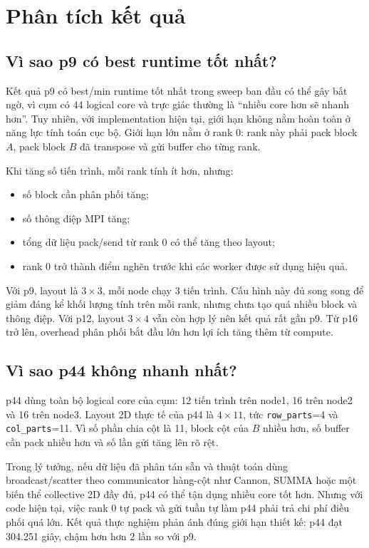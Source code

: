 \documentclass[12pt,a4paper]{article}
\newcommand{\code}[1]{\texttt{#1}}
\begin{document}
\section{Phân tích kết quả}
\subsection{Vì sao p9 có best runtime tốt nhất?}
Kết quả p9 có best/min runtime tốt nhất trong sweep ban đầu có thể gây bất ngờ, vì cụm có 44 logical core và trực giác thường là ``nhiều core hơn sẽ nhanh hơn''. Tuy nhiên, với implementation hiện tại, giới hạn không nằm hoàn toàn ở năng lực tính toán cục bộ. Giới hạn lớn nằm ở rank 0: rank này phải pack block $A$, pack block $B$ đã transpose và gửi buffer cho từng rank.

Khi tăng số tiến trình, mỗi rank tính ít hơn, nhưng:
\begin{itemize}
  \item số block cần phân phối tăng;
  \item số thông điệp MPI tăng;
  \item tổng dữ liệu pack/send từ rank 0 có thể tăng theo layout;
  \item rank 0 trở thành điểm nghẽn trước khi các worker được sử dụng hiệu quả.
\end{itemize}

Với p9, layout là $3 \times 3$, mỗi node chạy 3 tiến trình. Cấu hình này đủ song song để giảm đáng kể khối lượng tính trên mỗi rank, nhưng chưa tạo quá nhiều block và thông điệp. Với p12, layout $3 \times 4$ vẫn còn hợp lý nên kết quả rất gần p9. Từ p16 trở lên, overhead phân phối bắt đầu lớn hơn lợi ích tăng thêm từ compute.

\subsection{Vì sao p44 không nhanh nhất?}
p44 dùng toàn bộ logical core của cụm: 12 tiến trình trên node1, 16 trên node2 và 16 trên node3. Layout 2D thực tế của p44 là $4 \times 11$, tức \code{row\_parts}=4 và \code{col\_parts}=11. Vì số phần chia cột là 11, block cột của $B$ nhiều hơn, số buffer cần pack nhiều hơn và số lần gửi tăng lên rõ rệt.

Trong lý tưởng, nếu dữ liệu đã phân tán sẵn và thuật toán dùng broadcast/scatter theo communicator hàng-cột như Cannon, SUMMA hoặc một biến thể collective 2D đầy đủ, p44 có thể tận dụng nhiều core tốt hơn. Nhưng với code hiện tại, việc rank 0 tự pack và gửi tuần tự làm p44 phải trả chi phí điều phối quá lớn. Kết quả thực nghiệm phản ánh đúng giới hạn thiết kế: p44 đạt 304.251 giây, chậm hơn hơn 2 lần so với p9.
\end{document}
